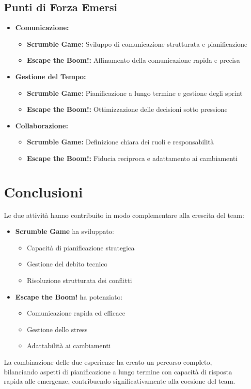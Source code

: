 \documentclass{article}
\begin{document}
\subsection*{Punti di Forza Emersi}
\begin{itemize}[leftmargin=1em]
    \item \textbf{Comunicazione:}
    \begin{itemize}[leftmargin=1em]
        \item \textbf{Scrumble Game:} Sviluppo di comunicazione strutturata e pianificazione
        \item \textbf{Escape the Boom!:} Affinamento della comunicazione rapida e precisa
    \end{itemize}
    
    \item \textbf{Gestione del Tempo:}
    \begin{itemize}[leftmargin=1em]
        \item \textbf{Scrumble Game:} Pianificazione a lungo termine e gestione degli sprint
        \item \textbf{Escape the Boom!:} Ottimizzazione delle decisioni sotto pressione
    \end{itemize}
    
    \item \textbf{Collaborazione:}
    \begin{itemize}[leftmargin=1em]
        \item \textbf{Scrumble Game:} Definizione chiara dei ruoli e responsabilità
        \item \textbf{Escape the Boom!:} Fiducia reciproca e adattamento ai cambiamenti
    \end{itemize}
\end{itemize}

\section*{Conclusioni}
Le due attività hanno contribuito in modo complementare alla crescita del team:

\begin{itemize}
    \item \textbf{Scrumble Game} ha sviluppato:
    \begin{itemize}
        \item Capacità di pianificazione strategica
        \item Gestione del debito tecnico
        \item Risoluzione strutturata dei conflitti
    \end{itemize}
    
    \item \textbf{Escape the Boom!} ha potenziato:
    \begin{itemize}
        \item Comunicazione rapida ed efficace
        \item Gestione dello stress
        \item Adattabilità ai cambiamenti
    \end{itemize}
\end{itemize}

La combinazione delle due esperienze ha creato un percorso completo, bilanciando aspetti di pianificazione a lungo termine con capacità di risposta rapida alle emergenze, contribuendo significativamente alla coesione del team.
\end{document}
